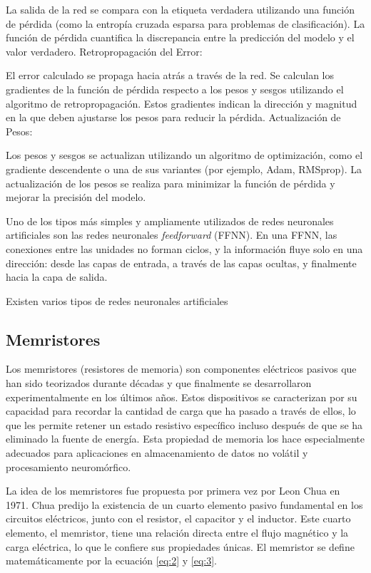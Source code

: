 \documentclass[conference]{IEEEtran}
\begin{document}
La salida de la red se compara con la etiqueta verdadera utilizando una función de pérdida (como la entropía cruzada esparsa para problemas de clasificación).
La función de pérdida cuantifica la discrepancia entre la predicción del modelo y el valor verdadero.
Retropropagación del Error:

El error calculado se propaga hacia atrás a través de la red.
Se calculan los gradientes de la función de pérdida respecto a los pesos y sesgos utilizando el algoritmo de retropropagación.
Estos gradientes indican la dirección y magnitud en la que deben ajustarse los pesos para reducir la pérdida.
Actualización de Pesos:

Los pesos y sesgos se actualizan utilizando un algoritmo de optimización, como el gradiente descendente o una de sus variantes (por ejemplo, Adam, RMSprop).
La actualización de los pesos se realiza para minimizar la función de pérdida y mejorar la precisión del modelo.

Uno de los tipos más simples y ampliamente utilizados de redes neuronales artificiales son las redes neuronales \textit{feedforward} (FFNN). En una FFNN, las conexiones entre las unidades no forman ciclos, y la información fluye solo en una dirección: desde las capas de entrada, a través de las capas ocultas, y finalmente hacia la capa de salida.

Existen varios tipos de redes neuronales artificiales

\subsection{Memristores}
Los memristores (resistores de memoria) son componentes eléctricos pasivos que han sido teorizados durante décadas y que finalmente se desarrollaron experimentalmente en los últimos años. Estos dispositivos se caracterizan por su capacidad para recordar la cantidad de carga que ha pasado a través de ellos, lo que les permite retener un estado resistivo específico incluso después de que se ha eliminado la fuente de energía. Esta propiedad de memoria los hace especialmente adecuados para aplicaciones en almacenamiento de datos no volátil y procesamiento neuromórfico.

La idea de los memristores fue propuesta por primera vez por Leon Chua en 1971. Chua predijo la existencia de un cuarto elemento pasivo fundamental en los circuitos eléctricos, junto con el resistor, el capacitor y el inductor. Este cuarto elemento, el memristor, tiene una relación directa entre el flujo magnético y la carga eléctrica, lo que le confiere sus propiedades únicas. El memristor se define matemáticamente por la ecuación \ref{eq:2} y \ref{eq:3}.
\end{document}
